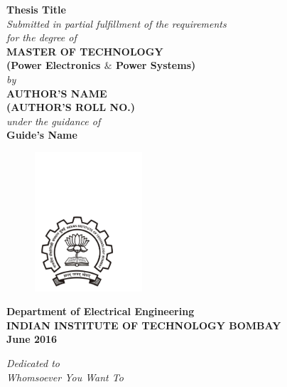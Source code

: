 \thispagestyle{empty}
\begin{center}
\huge
\textbf{Thesis Title}\\
\bigskip
\bigskip
\normalsize
\textit{Submitted in partial fulfillment of the requirements\\
                for  the degree of 
 }\\
\vspace*{0.8cm}
\textbf{MASTER OF TECHNOLOGY}\\
\textbf{(Power Electronics $ \& $ Power Systems)}\\
\vspace*{0.8cm}
\textit{by}\\
\vspace*{0.8cm}
\textbf{AUTHOR'S NAME \\(AUTHOR'S ROLL NO.)}\\
\vspace*{0.8cm}
\textit{under the guidance of}\\
\textbf{Guide's Name}\\
\vspace*{0.8cm}
\begin{figure}[h!]
 \centering
 \includegraphics[trim=1cm 1cm 5cm 12.5cm, clip=true, width=4cm]{chapter0_initial/logo}
\end{figure}
\bigskip
\bigskip
\large
\textbf{Department of Electrical Engineering}\\
\bigskip
\textbf{INDIAN INSTITUTE OF TECHNOLOGY BOMBAY}\\
\bigskip
\textbf{June 2016}
\end{center}

\normalsize
 



\newpage
\thispagestyle{empty}
\vspace*{200pt}
\begin{center}
 \large

 \textit{
Dedicated to\\
\bigskip
 Whomsoever You Want To}
\end{center}
\normalsize